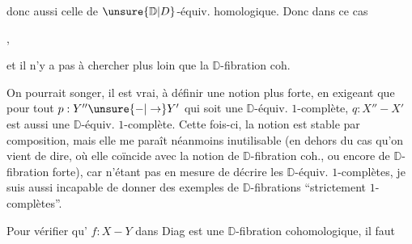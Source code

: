 donc aussi celle de $\unsure{\mathbb D|D}$-équiv. homologique. Donc dans ce cas

,

et il n'y a pas à chercher plus loin que la $\mathbb D$-fibration coh.

On pourrait songer, il est vrai, à définir   une notion plus forte, en exigeant que pour tout $p:Y''\unsure{\mathord{-}|\to}Y'$  qui soit une $\mathbb D$-équiv. $1$-complète, $q:X''-X'$ est aussi une $\mathbb D$-équiv. $1$-complète. Cette fois-ci, la notion est stable par composition, mais elle me paraît néanmoins inutilisable (en dehors du cas qu'on vient de dire, où elle coïncide avec la notion de $\mathbb D$-fibration coh., ou encore de $\mathbb D$-fibration forte), car n'étant pas en mesure de décrire les $\mathbb D$-équiv. $1$-complètes, je suis aussi incapable de  donner des exemples  de $\mathbb D$-fibrations ``strictement $1$-complètes''.


Pour vérifier qu' $f:X-Y$ dans Diag est une $\mathbb D$-fibration cohomologique, il faut
